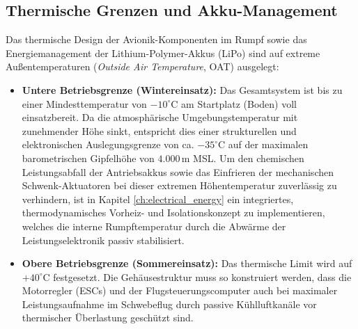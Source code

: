 \subsection{Thermische Grenzen und Akku-Management}
Das thermische Design der Avionik-Komponenten im Rumpf sowie das Energiemanagement der Lithium-Polymer-Akkus (LiPo) sind auf extreme Außentemperaturen (\textit{Outside Air Temperature}, OAT) ausgelegt:
\begin{itemize}
    \item \textbf{Untere Betriebsgrenze (Wintereinsatz):} Das Gesamtsystem ist bis zu einer Mindesttemperatur von $-10^\circ\text{C}$ am Startplatz (Boden) voll einsatzbereit. 
                                                          Da die atmosphärische Umgebungstemperatur mit zunehmender Höhe sinkt, entspricht dies einer strukturellen und elektronischen Auslegungsgrenze von ca. $-35^\circ\text{C}$ auf der maximalen barometrischen Gipfelhöhe von 
                                                          $4.000\,\text{m}$ MSL. Um den chemischen Leistungsabfall der Antriebsakkus sowie das Einfrieren der mechanischen Schwenk-Aktuatoren bei dieser extremen Höhentemperatur zuverlässig zu verhindern, 
                                                          ist in Kapitel \ref{ch:electrical_energy} ein integriertes, thermodynamisches Vorheiz- und Isolationskonzept zu implementieren, welches die interne Rumpftemperatur durch die Abwärme der Leistungselektronik passiv stabilisiert.
    \item \textbf{Obere Betriebsgrenze (Sommereinsatz):} Das thermische Limit wird auf $+40^\circ\text{C}$ festgesetzt. Die Gehäusestruktur muss so konstruiert werden, dass die Motorregler (ESCs) 
                                                         und der Flugsteuerungscomputer auch bei maximaler Leistungsaufnahme im Schwebeflug durch passive Kühlluftkanäle vor thermischer Überlastung geschützt sind.
\end{itemize}

